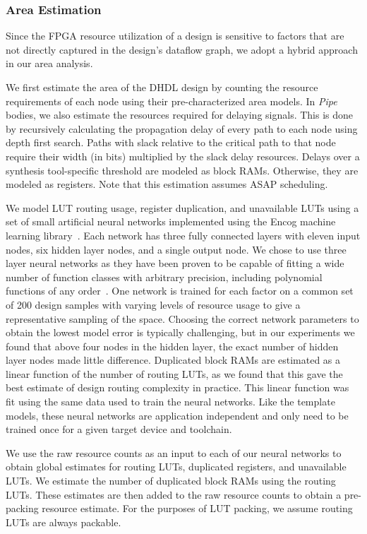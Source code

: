 \subsubsection{Area Estimation}
Since the FPGA resource utilization of a design is sensitive to factors that are not directly captured
in the design's dataflow graph, we adopt a hybrid approach in our area analysis.

We first estimate the area of the DHDL design by counting the resource
requirements of each node using their pre-characterized area models. In \emph{Pipe} bodies, we also
estimate the resources required for delaying signals. This is done by recursively calculating the
propagation delay of every path to each node using depth first search. Paths with slack relative to
the critical path to that node require their width (in bits) multiplied by the slack delay resources.
Delays over a synthesis tool-specific threshold are modeled as block RAMs.
Otherwise, they are modeled as registers. Note that this estimation assumes ASAP scheduling.

We model LUT routing usage, register duplication, and unavailable LUTs using a set of small artificial
neural networks implemented using the Encog machine learning library~\cite{encog}.
Each network has three fully connected layers with eleven input nodes, six hidden layer nodes, and a single output node. We chose to use
three layer neural networks as they have been proven to be capable of fitting a wide number of function classes with arbitrary precision, including polynomial functions of any order~\cite{science}.
One network is trained
for each factor on a common set of 200 design samples with varying levels of resource usage to give a representative sampling of the space. Choosing the correct
network parameters to obtain the lowest model error is typically challenging, but in our experiments we found that above four nodes in the hidden layer,
the exact number of hidden layer nodes made little difference.
Duplicated block RAMs are estimated as a linear function of the number of routing LUTs, as we found that this gave the best estimate of design routing complexity in practice. This linear function was fit using the same data used to train the neural networks. Like the template models, these neural networks are application independent and only need to be trained once for a given target device and toolchain.

We use the raw resource counts as an input to each of our neural networks to obtain global estimates for routing LUTs,
duplicated registers, and unavailable LUTs. We estimate the number of duplicated block RAMs using the routing LUTs.
These estimates are then added to the raw resource counts to obtain a pre-packing resource estimate. For the purposes
of LUT packing, we assume routing LUTs are always packable.

